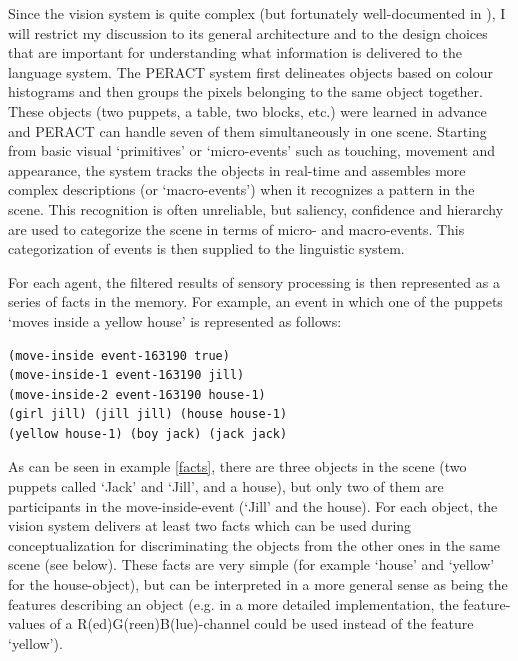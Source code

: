 Since the vision system is quite complex (but fortunately well-documented in \citealp{baillie00action}), I will restrict my discussion to its general architecture and to the design choices that are important for understanding what information is delivered to the language system. The PERACT system first delineates objects based on colour histograms and then groups the pixels belonging to the same object together. These objects (two puppets, a table, two blocks, etc.) were learned in advance and PERACT can handle seven of them simultaneously in one scene. Starting from basic visual `primitives' or `micro-events' such as touching, movement and appearance, the system tracks the objects in real-time and assembles more complex descriptions (or `macro-events') when it recognizes a pattern in the scene. This recognition is often unreliable, but saliency, confidence and hierarchy are used to categorize the scene in terms of micro- and macro-events. This categorization of events is then supplied to the linguistic system.

For each agent, the filtered results of sensory processing is then represented as a series of facts in the memory. For example, an event in which one of the puppets `moves inside a yellow house' is represented as follows:

\ea
\label{facts}
\begin{lstlisting}
(move-inside event-163190 true)
(move-inside-1 event-163190 jill)
(move-inside-2 event-163190 house-1)
(girl jill) (jill jill) (house house-1) 
(yellow house-1) (boy jack) (jack jack)
\end{lstlisting}
\z

As can be seen in example \ref{facts}, there are three objects in the scene (two puppets called `Jack' and `Jill', and a house), but only two of them are participants in the move-inside-event (`Jill' and the house). For each object, the vision system delivers at least two facts which can be used during conceptualization for discriminating the objects from the other ones in the same scene (see below). These facts are very simple (for example `house' and `yellow' for the house-object), but can be interpreted in a more general sense as being the features describing an object (e.g. in a more detailed implementation, the feature-values of a R(ed)G(reen)B(lue)-channel could be used instead of the feature `yellow').

